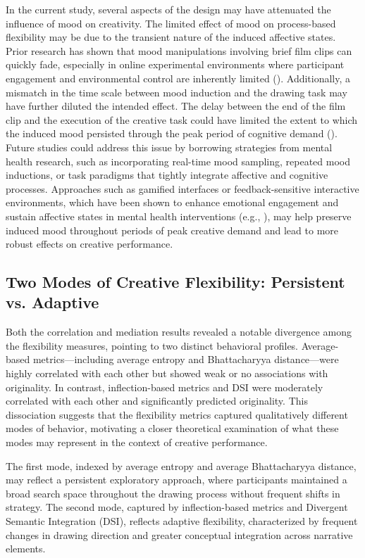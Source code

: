 \documentclass[../MA_Thesis.tex]{subfiles}
\begin{document}
In the current study, several aspects of the design may have attenuated the influence of mood on creativity. The limited effect of mood on process-based flexibility may be due to the transient nature of the induced affective states. Prior research has shown that mood manipulations involving brief film clips can quickly fade, especially in online experimental environments where participant engagement and environmental control are inherently limited (\cite{fong_effects_2006}). Additionally, a mismatch in the time scale between mood induction and the drawing task may have further diluted the intended effect. The delay between the end of the film clip and the execution of the creative task could have limited the extent to which the induced mood persisted through the peak period of cognitive demand (\cite{monno_duration_2024}). Future studies could address this issue by borrowing strategies from mental health research, such as incorporating real-time mood sampling, repeated mood inductions, or task paradigms that tightly integrate affective and cognitive processes. Approaches such as gamified interfaces or feedback-sensitive interactive environments, which have been shown to enhance emotional engagement and sustain affective states in mental health interventions (e.g., \cite{balaskas_ecological_2021}), may help preserve induced mood throughout periods of peak creative demand and lead to more robust effects on creative performance.

\subsection*{Two Modes of Creative Flexibility: Persistent vs. Adaptive}
Both the correlation and mediation results revealed a notable divergence among the flexibility measures, pointing to two distinct behavioral profiles. Average-based metrics—including average entropy and Bhattacharyya distance—were highly correlated with each other but showed weak or no associations with originality. In contrast, inflection-based metrics and DSI were moderately correlated with each other and significantly predicted originality. This dissociation suggests that the flexibility metrics captured qualitatively different modes of behavior, motivating a closer theoretical examination of what these modes may represent in the context of creative performance.

The first mode, indexed by average entropy and average Bhattacharyya distance, may reflect a persistent exploratory approach, where participants maintained a broad search space throughout the drawing process without frequent shifts in strategy. The second mode, captured by inflection-based metrics and Divergent Semantic Integration (DSI), reflects adaptive flexibility, characterized by frequent changes in drawing direction and greater conceptual integration across narrative elements.
\end{document}
